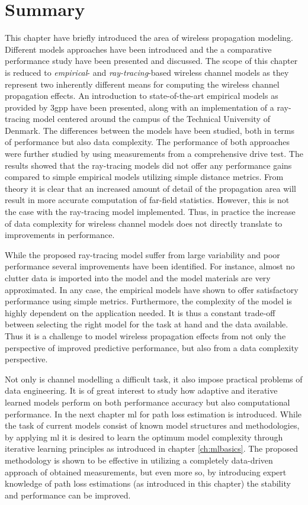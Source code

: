 \section{Summary}
This chapter have briefly introduced the area of wireless propagation modeling. Different models approaches have been introduced and the a comparative performance study have been presented and discussed. The scope of this chapter is reduced to \emph{empirical}- and \emph{ray-tracing}-based wireless channel models as they represent two inherently different means for computing the wireless channel propagation effects. An introduction to state-of-the-art empirical models as provided by \gls{3gpp} have been presented, along with an implementation of a ray-tracing model centered around the campus of the Technical University of Denmark. The differences between the models have been studied, both in terms of performance but also data complexity. The performance of both approaches were further studied by using measurements from a comprehensive drive test. The results showed that the ray-tracing models did not offer any performance gains compared to simple empirical models utilizing simple distance metrics. From theory it is clear that an increased amount of detail of the propagation area will result in more accurate computation of far-field statistics. However, this is not the case with the ray-tracing model implemented. Thus, in practice the increase of data complexity for wireless channel models does not directly translate to improvements in performance. 

While the proposed ray-tracing model suffer from large variability and poor performance several improvements have been identified. For instance, almost no clutter data is imported into the model and the model materials are very approximated. In any case, the empirical models have shown to offer satisfactory performance using simple metrics. Furthermore, the complexity of the model is highly dependent on the application needed. It is thus a constant trade-off between selecting the right model for the task at hand and the data available. Thus it is a challenge to model wireless propagation effects from not only the perspective of improved predictive performance, but also from a data complexity perspective. 

Not only is channel modelling a difficult task, it also impose practical problems of data engineering. It is of great interest to study how adaptive and iterative learned models perform on both performance accuracy but also computational performance. In the next chapter \gls{ml} for path loss estimation is introduced. While the task of current models consist of known model structures and methodologies, by applying \gls{ml} it is desired to learn the optimum model complexity through iterative learning principles as introduced in chapter \ref{ch:mlbasics}. The proposed methodology is shown to be effective in utilizing a completely data-driven approach of obtained measurements, but even more so, by introducing expert knowledge of path loss estimations (as introduced in this chapter) the stability and performance can be improved.